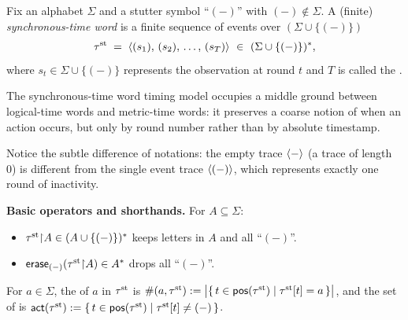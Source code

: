 \begin{definition}
  Fix an alphabet \(\Sigma\) and a stutter symbol ``\((-)\)'' with \( (-)\notin\Sigma \).
  A (finite) \emph{synchronous-time word} is a finite sequence of events over $(\Sigma\cup\{(-)\})$
  \[
  \taust \;=\; \trace{(s_1),\,(s_2),\,\dots,\,(s_T)} \ \in\ (\Sigma\cup\{(-)\})^{*},
  \]
  where \(s_t\in\Sigma\cup\{(-)\}\) represents the observation at round \(t\) and \(T\) is called the .
\end{definition}

The synchronous-time word timing model occupies a middle ground between logical-time words and metric-time words: it preserves a coarse notion of when an action occurs, but only by round number rather than by absolute timestamp.

Notice the subtle difference of notations: the empty trace \(\langle - \rangle \) (a trace of length 0) is different from the single event trace \(\langle (-) \rangle \), which represents exactly one round of inactivity.


  

\noindent\textbf{Basic operators and shorthands.}
For \(A\subseteq\Sigma\):
\begin{itemize}
  \item {} \( \tau^{\mathrm{st}}{\upharpoonright}A \in (A\cup\{(-)\})^{*} \) keeps letters in \(A\) and all ``\((-)\)''.
  \item {} \( \mathsf{erase}_{(-)}(\tau^{\mathrm{st}}{\upharpoonright}A)\in A^{*} \) drops all ``\((-)\)''.
\end{itemize}
For $a\in\Sigma$, the  of $a$ in $\tau^{\mathrm{st}}$ is $\#(a,\tau^{\mathrm{st}}):=\big|\{\, t\in\mathsf{pos}(\tau^{\mathrm{st}})\mid \tau^{\mathrm{st}}[t]=a \,\}\big|$, and the set of  is $\mathsf{act}(\tau^{\mathrm{st}}):=\{\, t\in\mathsf{pos}(\tau^{\mathrm{st}})\mid \tau^{\mathrm{st}}[t]\neq (-) \,\}$.


